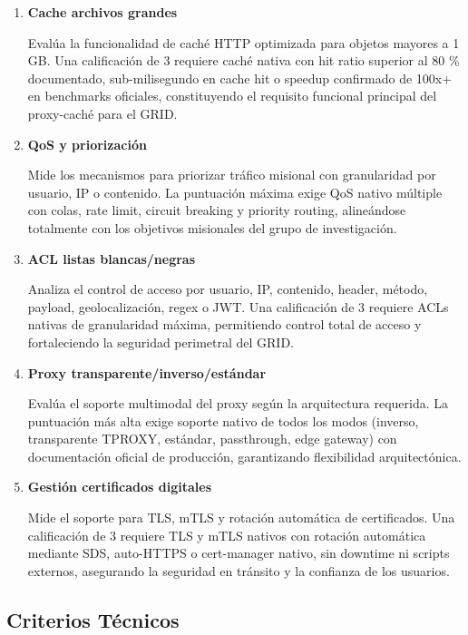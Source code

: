 \begin{enumerate}[resume*=criterios]
  \item \textbf{Cache archivos grandes}

  Evalúa la funcionalidad de caché HTTP optimizada para objetos mayores a 1 GB. Una calificación de 3 requiere caché nativa con hit ratio superior al 80 \% documentado, sub-milisegundo en cache hit o speedup confirmado de 100x+ en benchmarks oficiales, constituyendo el requisito funcional principal del proxy-caché para el GRID.

  \item \textbf{QoS y priorización}

  Mide los mecanismos para priorizar tráfico misional con granularidad por usuario, IP o contenido. La puntuación máxima exige QoS nativo múltiple con colas, rate limit, circuit breaking y priority routing, alineándose totalmente con los objetivos misionales del grupo de investigación.

  \item \textbf{ACL listas blancas/negras}

  Analiza el control de acceso por usuario, IP, contenido, header, método, payload, geolocalización, regex o JWT. Una calificación de 3 requiere ACLs nativas de granularidad máxima, permitiendo control total de acceso y fortaleciendo la seguridad perimetral del GRID.

  \item \textbf{Proxy transparente/inverso/estándar}

  Evalúa el soporte multimodal del proxy según la arquitectura requerida. La puntuación más alta exige soporte nativo de todos los modos (inverso, transparente TPROXY, estándar, passthrough, edge gateway) con documentación oficial de producción, garantizando flexibilidad arquitectónica.

  \item \textbf{Gestión certificados digitales}

  Mide el soporte para TLS, mTLS y rotación automática de certificados. Una calificación de 3 requiere TLS y mTLS nativos con rotación automática mediante SDS, auto-HTTPS o cert-manager nativo, sin downtime ni scripts externos, asegurando la seguridad en tránsito y la confianza de los usuarios.

\end{enumerate}

\subsection{Criterios Técnicos}

